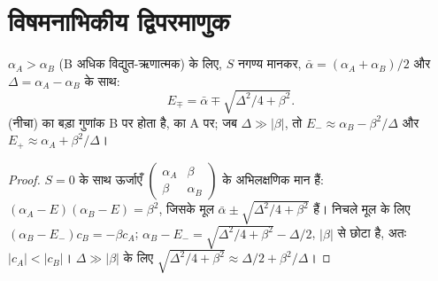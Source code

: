 \section{विषमनाभिकीय द्विपरमाणुक}

\begin{theorem}[भिन्न ऊर्जाओं वाले दो कक्षक]\label{thm:b2:diatomic-mos:heteronuclear}
$\alpha_A > \alpha_B$ (B अधिक विद्युत-ऋणात्मक) के लिए, $S$ नगण्य मानकर, $\bar\alpha = (\alpha_A
+ \alpha_B)/2$ और $\Delta = \alpha_A - \alpha_B$ के साथ:
\[
  E_\mp = \bar\alpha \mp \sqrt{\Delta^2/4 + \beta^2} .
\]
 (नीचा) का बड़ा गुणांक B पर होता है,  का A पर; जब $\Delta \gg |\beta|$, तो $E_- \approx \alpha_B - \beta^2/\Delta$ और $E_+
\approx \alpha_A + \beta^2/\Delta$।
\end{theorem}

\begin{proof}
$S = 0$ के साथ ऊर्जाएँ $\begin{pmatrix}\alpha_A & \beta \\
\beta & \alpha_B\end{pmatrix}$ के अभिलक्षणिक मान हैं: $(\alpha_A - E)(\alpha_B - E) = \beta^2$, जिसके मूल
$\bar\alpha \pm \sqrt{\Delta^2/4 + \beta^2}$ हैं। निचले मूल के लिए $(\alpha_B - E_-)c_B = -\beta
c_A$; $\alpha_B - E_- = \sqrt{\Delta^2/4 + \beta^2} - \Delta/2$, $|\beta|$ से छोटा है, अतः
$|c_A| < |c_B|$। $\Delta \gg |\beta|$ के लिए $\sqrt{\Delta^2/4 + \beta^2} \approx \Delta/2 +
\beta^2/\Delta$।
\end{proof}

